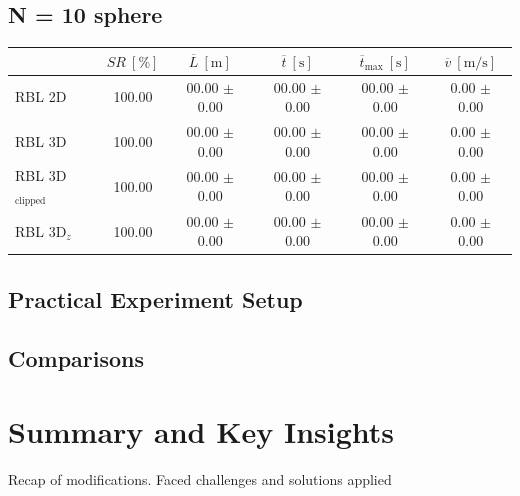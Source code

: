         \subsection{N = 10 sphere}
            \begin{table}[H]
                \centering
                \renewcommand{\arraystretch}{1.2}
                \begin{tabular}{|l|c|c|c|c|c|}
                \hline
                                            & \( SR \ [\%] \) & \( \overline{L} \ [\mathrm{m}] \) & \( \overline{t} \ [\mathrm{s}] \) & \( \overline{t}_{\text{max}} \ [\mathrm{s}] \) & \( \overline{v} \ [\mathrm{m/s}] \)     \\ \hline
                RBL 2D                      & 100.00          & 00.00 $\pm$ 0.00                  & 00.00 $\pm$ 0.00                  & 00.00 $\pm$ 0.00                               & 0.00 $\pm$ 0.00                         \\ \hline
                RBL 3D                      & 100.00          & 00.00 $\pm$ 0.00                  & 00.00 $\pm$ 0.00                  & 00.00 $\pm$ 0.00                               & 0.00 $\pm$ 0.00                         \\ \hline
                RBL 3D\(_{\text{clipped}}\) & 100.00          & 00.00 $\pm$ 0.00                  & 00.00 $\pm$ 0.00                  & 00.00 $\pm$ 0.00                               & 0.00 $\pm$ 0.00                         \\ \hline
                RBL 3D\(_z\)                & 100.00          & 00.00 $\pm$ 0.00                  & 00.00 $\pm$ 0.00                  & 00.00 $\pm$ 0.00                               & 0.00 $\pm$ 0.00                         \\ \hline
                \end{tabular}
            \end{table}


    \subsection{Practical Experiment Setup}
    \subsection{Comparisons}

\section{Summary and Key Insights}

    Recap of modifications. Faced challenges and solutions applied

